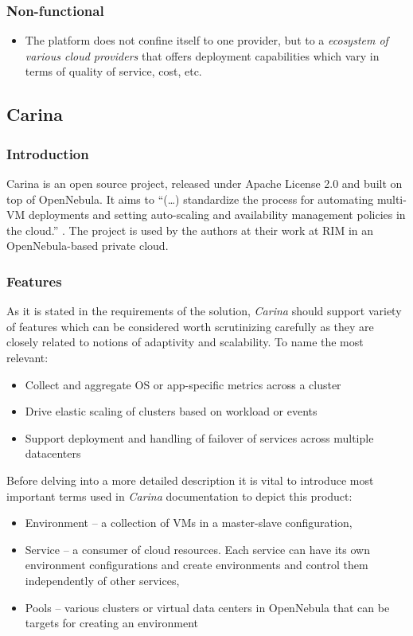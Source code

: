 \subsubsection{Non-functional}
\begin{itemize}
  \item The platform does not confine itself to one provider, but to a \emph{ecosystem of various cloud providers} that offers deployment capabilities which vary in terms of quality of service, cost, etc.
\end{itemize}
	
\subsection{Carina}

\subsubsection{Introduction}
Carina is an open source project, released under Apache License 2.0 and built on top of OpenNebula. It aims to ``(\ldots) standardize the process for automating multi-VM deployments and setting auto-scaling and availability management policies in the cloud.'' \cite{CarinaBlog}. The project is used by the authors at their work at RIM in an OpenNebula-based private cloud.

\subsubsection{Features}
As it is stated in the requirements of the solution, \emph{Carina} should support variety of features which can be considered worth scrutinizing carefully as they are closely related to notions of adaptivity and scalability. To name the most relevant: \cite{CarinaBlog}
\begin{itemize}
  \item Collect and aggregate OS or app-specific metrics across a cluster
  \item Drive elastic scaling of clusters based on workload or events
  \item Support deployment and handling of failover of services across multiple datacenters
\end{itemize}

Before delving into a more detailed description it is vital to introduce most important terms used in \emph{Carina} documentation to depict this product:
\begin{itemize}
  \item Environment -- a collection of VMs in a master-slave configuration,
  \item Service -- a consumer of cloud resources. Each service can have its own environment configurations and create environments and control them independently of other services,
  \item Pools -- various clusters or virtual data centers in OpenNebula that can be targets for creating an environment
\end{itemize}

